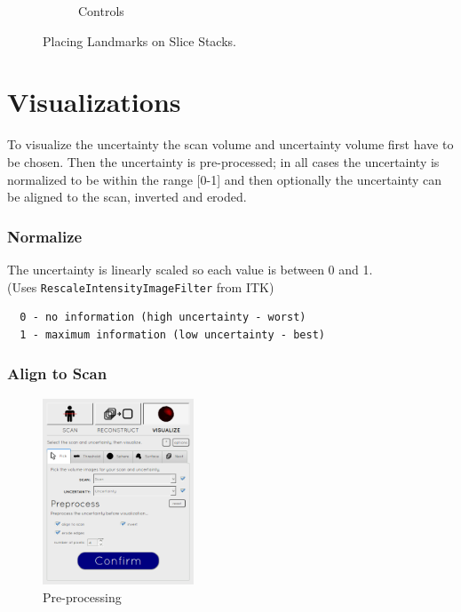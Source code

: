 \begin{figure}[H]
\begin{subfigure}[b]{0.441\textwidth}
    \caption*{Controls}
    \label{fig:reconstructioncontrols}
  \end{subfigure}
  \caption{Placing Landmarks on Slice Stacks.}\label{fig:reconstructionlandmarks}
\end{figure}

\clearpage
\section{Visualizations}\label{implementation:visualizations}
To visualize the uncertainty the scan volume and uncertainty volume first have to be chosen. Then the uncertainty is pre-processed; in all cases the uncertainty is normalized to be within the range [0-1] and then optionally the uncertainty can be aligned to the scan, inverted and eroded.

\subsubsection*{Normalize}
The uncertainty is linearly scaled so each value is between 0 and 1.\\(Uses \texttt{RescaleIntensityImageFilter} from ITK)

\begin{verbatim}
  0 - no information (high uncertainty - worst)
  1 - maximum information (low uncertainty - best)
\end{verbatim}

\subsubsection*{Align to Scan}
\begin{figure}
  \vspace{-20pt}
  \includegraphics[width=0.4\textwidth]{images/pre-processing.png}
  \caption{Pre-processing}\label{fig:pre-processing_settings}
\end{figure}

